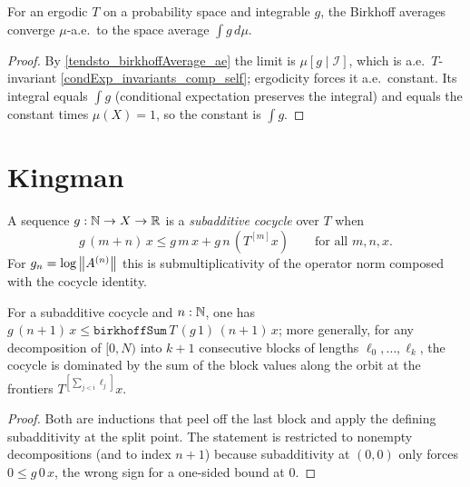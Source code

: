 \begin{corollary}\label{tendsto_birkhoffAverage_ae_integral}
  \leanok
  For an ergodic \(T\) on a probability space and integrable \(g\), the Birkhoff
  averages converge \(\mu\)-a.e.\ to the space average \(\int g\, d\mu\).
\end{corollary}
\begin{proof}\leanok
  By \cref{tendsto_birkhoffAverage_ae} the limit is \(\mu[g\mid\mathcal I]\),
  which is a.e.\ \(T\)-invariant \cref{condExp_invariants_comp_self}; ergodicity
  forces it a.e.\ constant. Its integral equals \(\int g\) (conditional
  expectation preserves the integral) and equals the constant times
  \(\mu(X) = 1\), so the constant is \(\int g\).
\end{proof}

\section{Kingman}

\begin{definition}\label{IsSubadditiveCocycle}
  \leanok
  A sequence \(g : \mathbb{N} \to X \to \mathbb{R}\) is a \emph{subadditive cocycle} over \(T\)
  when
  \[
    g\,(m+n)\,x \le g\,m\,x + g\,n\,(T^{[m]}x)
      \qquad \text{for all } m, n, x.
  \]
  For \(g_n = \log\left\lVert A^{(n)} \right\rVert\) this is submultiplicativity of the operator
  norm composed with the cocycle identity.
\end{definition}

\begin{lemma}\label{le_birkhoffSum_one}
  \leanok
  For a subadditive cocycle and \(n : \mathbb{N}\), one has
  \(g\,(n+1)\,x \le \texttt{birkhoffSum}\,T\,(g\,1)\,(n+1)\,x\); more generally,
  for any decomposition of \([0,N)\) into \(k+1\) consecutive blocks of lengths
  \(\ell_0, \dots, \ell_k\), the cocycle is dominated by the sum of the block
  values along the orbit at the frontiers \(T^{[\sum_{j<i}\ell_j]}x\).
\end{lemma}
\begin{proof}\leanok
  Both are inductions that peel off the last block and apply the defining
  subadditivity at the split point. The statement is restricted to nonempty
  decompositions (and to index \(n+1\)) because subadditivity at \((0,0)\) only
  forces \(0 \le g\,0\,x\), the wrong sign for a one-sided bound at \(0\).
\end{proof}


